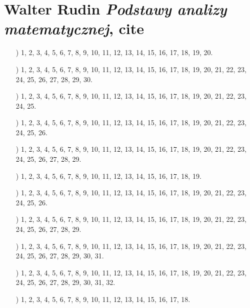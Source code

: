 \documentclass[a4paper,11pt]{article}
\numberwithin{equation}{section}
\begin{document}
\section{Walter Rudin \textit{Podstawy analizy
    matematycznej}, cite{}}

\label{sec:Oznaczenia-i-konwencje}


\begin{itemize}

\item[ \romannumeral1)] 1, 2, 3, 4, 5, 6, 7, 8, 9, 10, 11, 12, 13, 14, 15,
  16, 17, 18, 19, 20.

\item[\romannumeral2)] 1, 2, 3, 4, 5, 6, 7, 8, 9, 10, 11, 12, 13, 14, 15,
  16, 17, 18, 19, 20, 21, 22, 23, 24, 25, 26, 27, 28, 29, 30.

\item[\romannumeral3)] 1, 2, 3, 4, 5, 6, 7, 8, 9, 10, 11, 12, 13, 14, 15,
  16, 17, 18, 19, 20, 21, 22, 23, 24, 25.

\item[\romannumeral4)] 1, 2, 3, 4, 5, 6, 7, 8, 9, 10, 11, 12, 13, 14, 15,
  16, 17, 18, 19, 20, 21, 22, 23, 24, 25, 26.

\item[\romannumeral5)] 1, 2, 3, 4, 5, 6, 7, 8, 9, 10, 11, 12, 13, 14, 15,
  16, 17, 18, 19, 20, 21, 22, 23, 24, 25, 26, 27, 28, 29.

\item[\romannumeral6)] 1, 2, 3, 4, 5, 6, 7, 8, 9, 10, 11, 12, 13, 14, 15,
  16, 17, 18, 19.

\item[\romannumeral7)] 1, 2, 3, 4, 5, 6, 7, 8, 9, 10, 11, 12, 13, 14, 15,
  16, 17, 18, 19, 20, 21, 22, 23, 24, 25, 26.

\item[\romannumeral8)] 1, 2, 3, 4, 5, 6, 7, 8, 9, 10, 11, 12, 13, 14, 15,
  16, 17, 18, 19, 20, 21, 22, 23, 24, 25, 26, 27, 28, 29.

\item[\romannumeral9)] 1, 2, 3, 4, 5, 6, 7, 8, 9, 10, 11, 12, 13, 14, 15,
  16, 17, 18, 19, 20, 21, 22, 23, 24, 25, 26, 27, 28, 29, 30, 31.

\item[\romannumeral10)] 1, 2, 3, 4, 5, 6, 7, 8, 9, 10, 11, 12, 13, 14, 15,
  16, 17, 18, 19, 20, 21, 22, 23, 24, 25, 26, 27, 28, 29, 30, 31, 32.

\item[\romannumeral11)] 1, 2, 3, 4, 5, 6, 7, 8, 9, 10, 11, 12, 13, 14, 15,
  16, 17, 18.

\end{itemize}
\end{document}
